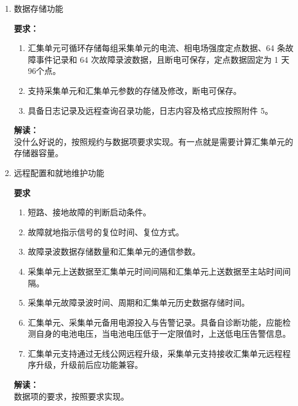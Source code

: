 \documentclass{article}
\begin{document}
\begin{CJK}{UTF8}{gbsn}
\begin{enumerate}
	\item 数据存储功能 
		\par
		\textbf{要求：}
		\begin{enumerate}
		\item 汇集单元可循环存储每组采集单元的电流、相电场强度定点数据、64 条故障事件记录和 64 次故障录波数据，且断电可保存，定点数据固定为 1 天 96个点。 
		\item 支持采集单元和汇集单元参数的存储及修改，断电可保存。 
		\item 具备日志记录及远程查询召录功能，日志内容及格式应按照附件 5。 
		\end{enumerate}
		\textbf{解读：}\\
		没什么好说的，按照规约与数据项要求实现。有一点就是需要计算汇集单元的存储器容量。

	\item 远程配置和就地维护功能 
		\par
		\textbf{要求}
		\begin{enumerate}
		\item 短路、接地故障的判断启动条件。 
		\item 故障就地指示信号的复位时间、复位方式。 
		\item 故障录波数据存储数量和汇集单元的通信参数。 
		\item 采集单元上送数据至汇集单元时间间隔和汇集单元上送数据至主站时间间隔。 
		\item 采集单元故障录波时间、周期和汇集单元历史数据存储时间。 
		\item 汇集单元、采集单元备用电源投入与告警记录。具备自诊断功能，应能检测自身的电池电压，当电池电压低于一定限值时，上送低电压告警信息。 
		\item 汇集单元支持通过无线公网远程升级，采集单元支持接收汇集单元远程程序升级，升级前后应功能兼容。 
		\end{enumerate}
		\textbf{解读：}\\
		数据项的要求，按照要求实现。


\end{enumerate}
\end{CJK}
\end{document}
